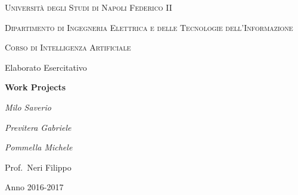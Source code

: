 \documentclass[a4paper,12pt]{report}
\begin{document}
        
	\begin{titlepage}
		\centering
		{\scshape\huge Università degli Studi di Napoli Federico II \par}
		\vspace{1cm}
		{\scshape\large Dipartimento di Ingegneria Elettrica e delle Tecnologie dell'Informazione\par}
		\vspace{0.5cm}
		{\scshape\large Corso di Intelligenza Artificiale\par}
		\vspace{1.5cm}
		{\ttfamily\Large Elaborato Esercitativo\par}
		\vspace{0.5cm}
		{\huge\bfseries Work Projects\par}
		\vspace{2cm}
		{\Large\itshape Milo Saverio\par}
		{\Large\itshape Previtera Gabriele\par}
		{\Large\itshape Pommella Michele\par}
		\vspace{1.5cm}
		{\large Prof.~Neri Filippo\par}
		
		\vfill
		
		{\large Anno 2016-2017\par}
		
		
	\end{titlepage}
\end{document}
